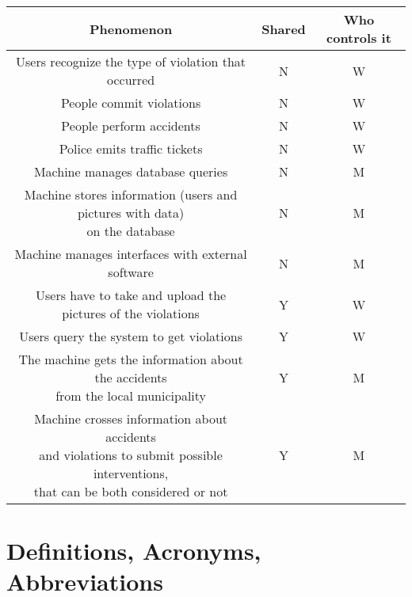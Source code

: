 \documentclass[../RASD.tex]{subfiles}
\begin{document}
        \newpage
        \begin{center}
            \begin{tabular}{ ||c|c|c|| }

                \hline
                \textbf{Phenomenon} & \textbf{Shared} & \textbf{Who controls it} \\ \hline
                Users recognize the type of violation that occurred & N & W \\ \hline
                People commit violations & N & W\\ \hline
                People perform accidents & N & W\\ \hline
                Police emits traffic tickets & N & W\\ \hline
                Machine manages database queries & N & M\\ \hline
                \makecell{Machine stores information (users and pictures with data)
                \\ on the database} & N & M\\ \hline
                Machine manages interfaces with external software & N & M\\ \hline
                Users have to take and upload the pictures of the violations & Y & W\\ \hline
                Users query the system to get violations & Y & W\\ \hline
                \makecell{The machine gets the information about the accidents
                \\from the local municipality} & Y & M\\ \hline
                \makecell{Machine crosses information about accidents
                \\and violations to submit possible interventions,
                \\that can be both considered or not} & Y & M\\
                \hline
            \end{tabular}
        \end{center}
    \newpage
    \section{Definitions, Acronyms, Abbreviations}\label{sec:definitions,-acronyms,-abbreviations}
\end{document}
